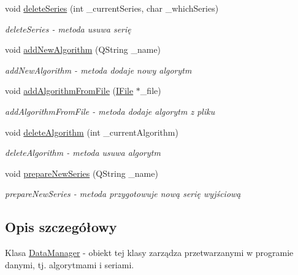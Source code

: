 \begin{DoxyCompactItemize}
void \hyperlink{class_data_manager_ab3095e58be93fcb77a4f4814f08fb3ec}{delete\+Series} (int \+\_\+current\+Series, char \+\_\+which\+Series)
\begin{DoxyCompactList}\small\item\em delete\+Series -\/ metoda usuwa serię \end{DoxyCompactList}\item 
void \hyperlink{class_data_manager_a1c252d92169045d9ac646dc264de9397}{add\+New\+Algorithm} (Q\+String \+\_\+name)
\begin{DoxyCompactList}\small\item\em add\+New\+Algorithm -\/ metoda dodaje nowy algorytm \end{DoxyCompactList}\item 
void \hyperlink{class_data_manager_a2664e4d4e1026d9eccde04def2fa0278}{add\+Algorithm\+From\+File} (\hyperlink{class_i_file}{I\+File} $\ast$\+\_\+file)
\begin{DoxyCompactList}\small\item\em add\+Algorithm\+From\+File -\/ metoda dodaje algorytm z pliku \end{DoxyCompactList}\item 
void \hyperlink{class_data_manager_a98d1a9bb8759afe78b86a1a9c5c891fd}{delete\+Algorithm} (int \+\_\+current\+Algorithm)
\begin{DoxyCompactList}\small\item\em delete\+Algorithm -\/ metoda usuwa algorytm \end{DoxyCompactList}\item 
void \hyperlink{class_data_manager_afad3b8ee5ba4463d53da7406bec8e2aa}{prepare\+New\+Series} (Q\+String \+\_\+name)
\begin{DoxyCompactList}\small\item\em prepare\+New\+Series -\/ metoda przygotowuje nową serię wyjściową \end{DoxyCompactList}\end{DoxyCompactItemize}


\subsection{Opis szczegółowy}
Klasa \hyperlink{class_data_manager}{Data\+Manager} -\/ obiekt tej klasy zarządza przetwarzanymi w programie danymi, tj. algorytmami i seriami. 

